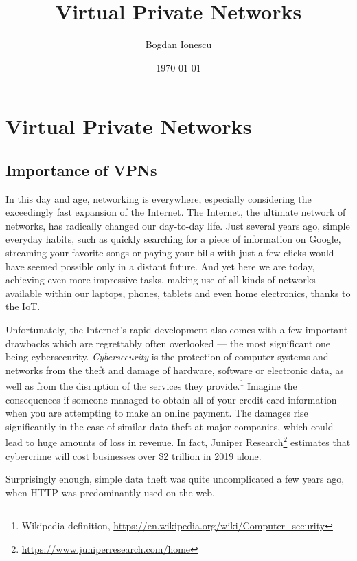 \documentclass[a4paper,12pt]{report}
\begin{document}
	\title{Virtual Private Networks}
	\author{Bogdan Ionescu}
	\date{\today}
	\maketitle
	\tableofcontents
	
	\chapter{Virtual Private Networks}
	\section{Importance of VPNs}
		In this day and age, networking is everywhere, especially considering the exceedingly fast expansion of the Internet. The Internet, the ultimate network of networks, has radically changed our day-to-day life. Just several years ago, simple everyday habits, such as quickly searching for a piece of information on Google, streaming your favorite songs or paying your bills with just a few clicks would have seemed possible only in a distant future. And yet here we are today, achieving even more impressive tasks, making use of all kinds of networks available within our laptops, phones, tablets and even home electronics, thanks to the IoT.
		
		Unfortunately, the Internet's rapid development also comes with a few important drawbacks which are regrettably often overlooked --- the most significant one being cybersecurity. \textit{Cybersecurity} is the protection of computer systems and networks from the theft and damage of hardware, software or electronic data, as well as from the disruption of the services they provide.\footnote{Wikipedia definition, \url{https://en.wikipedia.org/wiki/Computer_security}} Imagine the consequences if someone managed to obtain all of your credit card information when you are attempting to make an online payment. The damages rise significantly in the case of similar data theft at major companies, which could lead to huge amounts of loss in revenue. In fact, Juniper Research\footnote{\url{https://www.juniperresearch.com/home}} estimates that cybercrime will cost businesses over \$2 trillion in 2019 alone.
		
		Surprisingly enough, simple data theft was quite uncomplicated a few years ago, when HTTP was predominantly used on the web.
\end{document}
